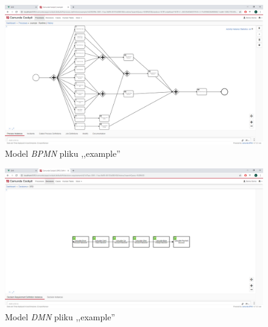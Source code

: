 \begin{figure}
    \centering
    \includegraphics[width=\textwidth]{./assets/camundaExampleBPMN.png}
    \caption{Model \emph{BPMN} pliku ,,example''}
    \label{fig:camundaExampleBPMN}
\end{figure}
\begin{figure}
    \centering
    \includegraphics[width=\textwidth]{./assets/camundaExampleDMN.png}
    \caption{Model \emph{DMN} pliku ,,example''}
    \label{fig:camundaExampleDMN}
\end{figure}

